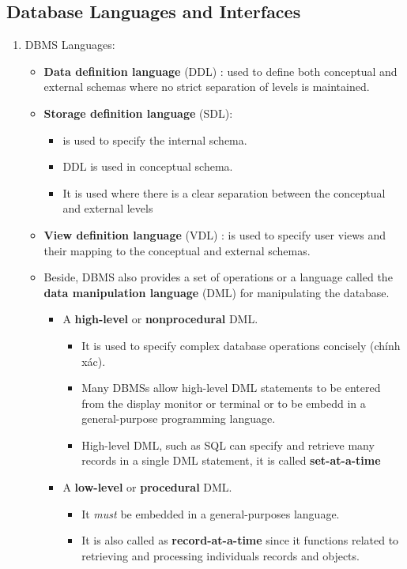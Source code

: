 \documentclass[10pt]{article}
\begin{document}
\subsection{Database Languages and Interfaces}
\begin{enumerate}
	\item DBMS Languages:
	\begin{itemize}
		\item \textbf{Data definition language} (DDL) : used to define both conceptual and external schemas where no strict separation of levels is maintained.
		\item \textbf{Storage definition language} (SDL):
		\begin{itemize}
			\item is used to specify the internal schema.
			\item DDL is used in conceptual schema.
			\item It is used where there is a clear separation between the conceptual and external levels
		\end{itemize}  
		\item \textbf{View definition language} (VDL) : is used to specify user views and their mapping to the conceptual and external schemas.
		\item Beside, DBMS also provides a set of operations or a language called the \textbf{data manipulation language} (DML) for manipulating the database. \\

		\begin{itemize}
			\item A \textbf{high-level} or \textbf{nonprocedural} DML.
			\begin{itemize}
				\item It is used to specify complex database operations concisely (chính xác).
				\item Many DBMSs allow high-level DML statements to be entered from the display monitor or terminal or to be embedd in a general-purpose programming language.
				\item High-level DML, such as SQL can specify and retrieve many records in a single DML statement, it is called \textbf{set-at-a-time} 
			\end{itemize}
			\item A \textbf{low-level} or \textbf{procedural} DML.
			\begin{itemize}
				\item It \textit{must} be embedded in a general-purposes language.
				\item It is also called as \textbf{record-at-a-time} since it functions related to retrieving and processing individuals records and objects.
			\end{itemize}
		\end{itemize}


\end{itemize}
\end{enumerate}
\end{document}
